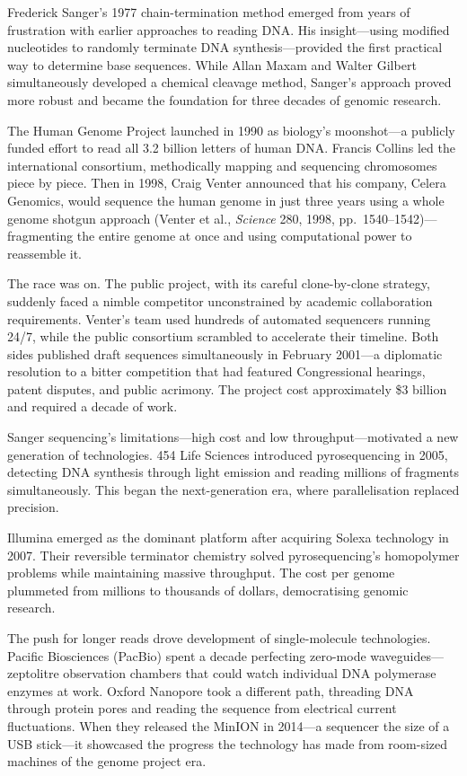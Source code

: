 \begin{historical}
Frederick Sanger's 1977 chain-termination method emerged from years of frustration with earlier approaches to reading DNA. His insight—using modified nucleotides to randomly terminate DNA synthesis—provided the first practical way to determine base sequences. While Allan Maxam and Walter Gilbert simultaneously developed a chemical cleavage method, Sanger's approach proved more robust and became the foundation for three decades of genomic research.

The Human Genome Project launched in 1990 as biology's moonshot—a publicly funded effort to read all 3.2 billion letters of human DNA. Francis Collins led the international consortium, methodically mapping and sequencing chromosomes piece by piece. Then in 1998, Craig Venter announced that his company, Celera Genomics, would sequence the human genome in just three years using a \QSOpen{}whole genome shotgun\QSClose{} approach (Venter et al., \textit{Science} 280, 1998, pp.~1540–1542)—fragmenting the entire genome at once and using computational power to reassemble it.

The race was on. The public project, with its careful clone-by-clone strategy, suddenly faced a nimble competitor unconstrained by academic collaboration requirements. Venter's team used hundreds of automated sequencers running 24/7, while the public consortium scrambled to accelerate their timeline. Both sides published draft sequences simultaneously in February 2001—a diplomatic resolution to a bitter competition that had featured Congressional hearings, patent disputes, and public acrimony. The project cost approximately \$3 billion and required a decade of work.

Sanger sequencing's limitations—high cost and low throughput—motivated a new generation of technologies. 454 Life Sciences introduced pyrosequencing in 2005, detecting DNA synthesis through light emission and reading millions of fragments simultaneously. This began the \QSOpen{}next-generation\QSClose{} era, where parallelisation replaced precision.

Illumina emerged as the dominant platform after acquiring Solexa technology in 2007. Their reversible terminator chemistry solved pyrosequencing's homopolymer problems while maintaining massive throughput. The cost per genome plummeted from millions to thousands of dollars, democratising genomic research.

The push for longer reads drove development of single-molecule technologies. Pacific Biosciences (PacBio) spent a decade perfecting zero-mode waveguides—zeptolitre observation chambers that could watch individual DNA polymerase enzymes at work. Oxford Nanopore took a different path, threading DNA through protein pores and reading the sequence from electrical current fluctuations. When they released the MinION in 2014—a sequencer the size of a USB stick—it showcased the progress the technology has made from room-sized machines of the genome project era.


\end{historical}
